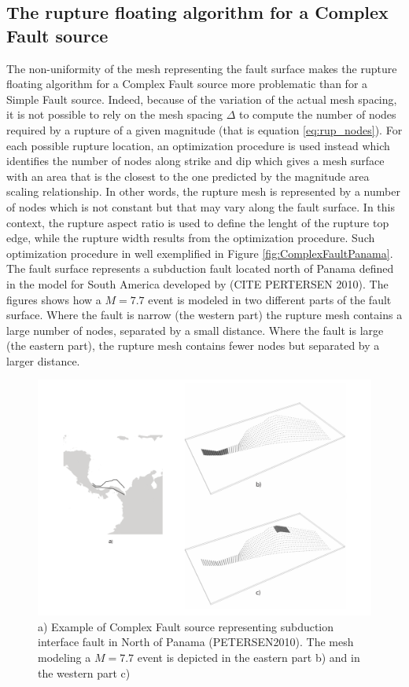 \subsection{The rupture floating algorithm for a Complex Fault source}
The non-uniformity of the mesh representing the fault surface makes the rupture floating algorithm for a Complex
Fault source more problematic than for a Simple Fault source. Indeed, because of the variation of the actual mesh spacing, it is not possible to rely on the mesh spacing $\Delta$ to compute the number of nodes required by a rupture of a given magnitude (that is equation \ref{eq:rup_nodes}). For each possible rupture location, an optimization
procedure is used instead which identifies the number of nodes along strike and dip which gives a mesh surface with an area that is the closest to the one predicted by the magnitude area scaling relationship. In other words, the rupture mesh is represented by a number of nodes which is not constant but that may vary along the fault surface. In this context, the rupture aspect ratio is used to define the lenght of the rupture top edge, while the rupture width results from the optimization procedure. Such optimization procedure in well exemplified in Figure \ref{fig:ComplexFaultPanama}. The fault surface represents a subduction fault located north of Panama defined
in the model for South America developed by (CITE PERTERSEN 2010). The figures shows how a $M=7.7$ event is modeled in two different parts of the fault surface. Where the fault is narrow (the western part) the rupture mesh
contains a large number of nodes, separated by a small distance. Where the fault is large (the eastern part), the
rupture mesh contains fewer nodes but separated by a larger distance.
\begin{figure}
\centering
\includegraphics[width=14cm]{./Pictures/ComplexFaultPanama.pdf}
\caption{a) Example of Complex Fault source representing subduction interface fault in North of Panama (PETERSEN2010). The mesh modeling a $M=7.7$ event is depicted in the eastern part b) and in the western part c)}
\label{fig:ComplexFaultSourcePanama}
\end{figure}

